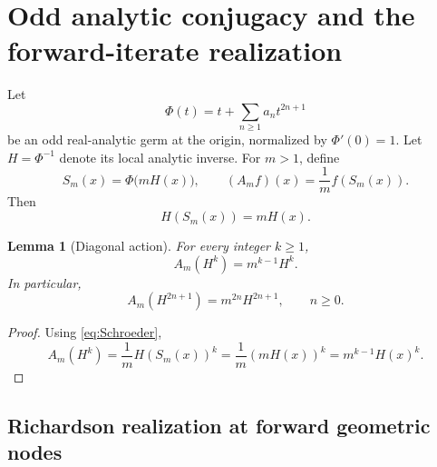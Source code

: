 \documentclass[11pt]{article}
\newtheorem{lemma}[theorem]{Lemma}
\theoremstyle{remark}
\begin{document}
\section{Odd analytic conjugacy and the forward-iterate realization}

Let
\begin{equation}
\Phi(t)
=
 t+\sum_{n\ge1}a_n t^{2n+1}
\label{eq:Phi}
\end{equation}
be an odd real-analytic germ at the origin, normalized by
\(\Phi'(0)=1\).  Let \(H=\Phi^{-1}\) denote its local analytic inverse.
For \(m>1\), define
\begin{equation}
S_m(x)=\Phi\!\bigl(mH(x)\bigr),
\qquad
(A_mf)(x)=\frac1m f(S_m(x)).
\label{eq:SmAm}
\end{equation}
Then
\begin{equation}
H(S_m(x))=mH(x).
\label{eq:Schroeder}
\end{equation}

\begin{lemma}[Diagonal action]
\label{lem:diag}
For every integer \(k\ge1\),
\begin{equation}
A_m(H^k)=m^{k-1}H^k.
\label{eq:fullDiag}
\end{equation}
In particular,
\begin{equation}
A_m(H^{2n+1})=m^{2n}H^{2n+1},
\qquad n\ge0.
\label{eq:oddDiag}
\end{equation}
\end{lemma}

\begin{proof}
Using \eqref{eq:Schroeder},
\[
A_m(H^k)
=
\frac1m H(S_m(x))^k
=
\frac1m(mH(x))^k
=
m^{k-1}H(x)^k.
\]
\end{proof}

\subsection{Richardson realization at forward geometric nodes}
\end{document}
